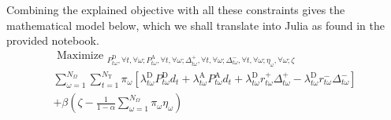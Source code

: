 Combining the explained objective with all these constraints gives the mathematical model below, which we shall translate into Julia as found in the provided notebook.  
\begin{equation}
\begin{array}{c}
\text { Maximize }_{P_{t \omega}^{\mathrm{D}}, \forall t, \forall \omega ; P_{t \omega}^{\mathrm{A}}, \forall t, \forall \omega ; \Delta_{t \omega}^{+}, \forall t, \forall \omega ; \Delta_{t \omega}^{-}, \forall t, \forall \omega ; \eta_{\omega}, \forall \omega ; \zeta} \\
\sum_{\omega=1}^{N_{\Omega}} \sum_{t=1}^{N_{\mathrm{T}}} \pi_{\omega}\left[\lambda_{t \omega}^{\mathrm{D}} P_{t \omega}^{\mathrm{D}} d_{t}+\lambda_{t \omega}^{\mathrm{A}} P_{t \omega}^{\mathrm{A}} d_{t}+\lambda_{t \omega}^{\mathrm{D}} r_{t \omega}^{+} \Delta_{t \omega}^{+}-\lambda_{t \omega}^{\mathrm{D}} r_{t \omega}^{-} \Delta_{t \omega}^{-}\right] 
\\+\beta\left(\zeta-\frac{1}{1-\alpha} \sum_{\omega=1}^{N_{\Omega}} \pi_{\omega} \eta_{\omega}\right)
\end{array}
\end{equation} 
